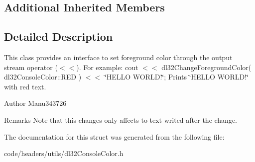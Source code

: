 \subsection*{Additional Inherited Members}


\subsection{Detailed Description}
This class provides an interface to set foreground color through the output stream operator ($<$$<$). For example\-: cout $<$$<$ dl32\-Change\-Foreground\-Color( dl32\-Console\-Color\-::\-R\-E\-D ) $<$$<$ \char`\"{}\-H\-E\-L\-L\-O W\-O\-R\-L\-D!\char`\"{}; Prints \char`\"{}\-H\-E\-L\-L\-O W\-O\-R\-L\-D!\char`\"{} with red text. 

\begin{DoxyAuthor}{Author}
Manu343726
\end{DoxyAuthor}
\begin{DoxyRemark}{Remarks}
Note that this changes only affects to text writed after the change. 
\end{DoxyRemark}


The documentation for this struct was generated from the following file\-:\begin{DoxyCompactItemize}
\item 
code/headers/utils/dl32\-Console\-Color.\-h\end{DoxyCompactItemize}
